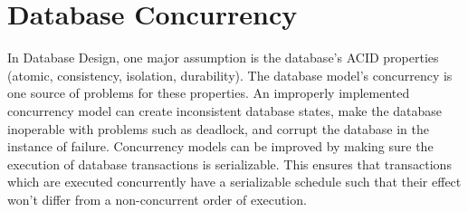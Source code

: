 \section{Database Concurrency}
In Database Design, one major assumption is the database’s ACID properties (atomic, consistency, isolation, durability). The database model’s concurrency is one source of problems for these properties. An improperly implemented concurrency model can create inconsistent database states, make the database inoperable with problems such as deadlock, and corrupt the database in the instance of failure. Concurrency models can be improved by making sure the execution of database transactions is serializable. This ensures that transactions which are executed concurrently have a serializable schedule such that their effect won’t differ from a non-concurrent order of execution.


